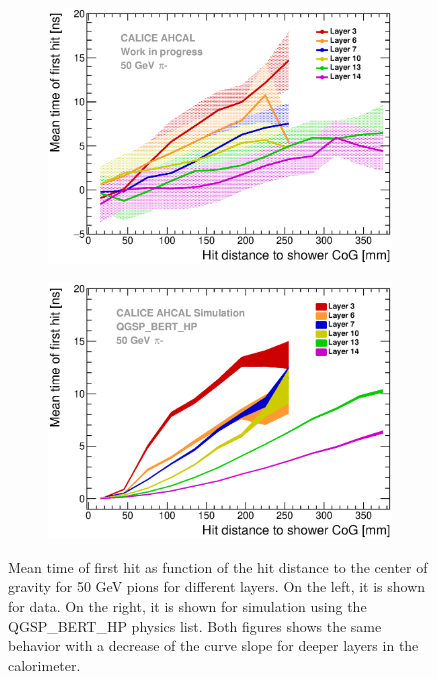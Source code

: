 \begin{figure}[htbp!]
	\begin{subfigure}[t]{0.49\textwidth}
		\centering
		\includegraphics[width=1\textwidth]{../Thesis_Plots/Timing/Pions/Plots/Timing_Radius_Comparison_ShortAsymRange_IndividualLayers.eps}
		\caption{}\label{fig:Radius_Indivi}
	\end{subfigure}
	\hfill
	\begin{subfigure}[t]{0.49\textwidth}
		\centering
		\includegraphics[width=1\textwidth]{../Thesis_Plots/Timing/Pions/Plots/Timing_Radius_Comparison_ShortAsymRange_IndividualLayers_Sim.eps}
		\caption{}\label{fig:Radius_Indivi_Sim}
	\end{subfigure}
	\caption{Mean time of first hit as function of the hit distance to the center of gravity for 50 GeV pions for different layers. On the left, it is shown for data. On the right, it is shown for simulation using the QGSP\_BERT\_HP physics list. Both figures shows the same behavior with a decrease of the curve slope for deeper layers in the calorimeter.}
	\label{fig:Radius_IndiviAll}
\end{figure}

